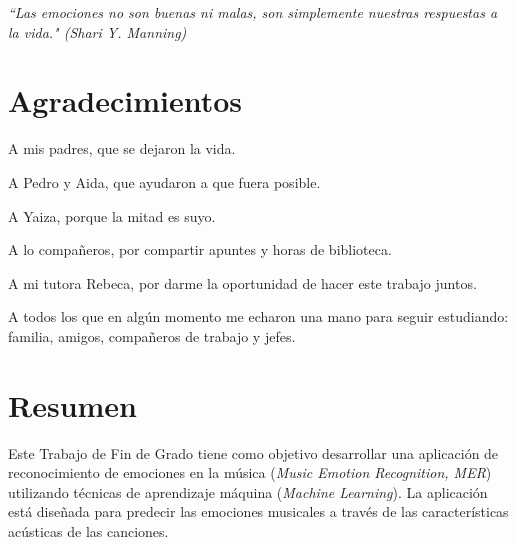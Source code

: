 \documentclass[12pt,a4paper]{article}
\begin{document}
\newpage
\thispagestyle{empty} %
\begin{flushright}
	\vspace*{5cm}
 	\textit{“Las emociones no son buenas ni malas, son simplemente nuestras respuestas a la vida." (Shari Y. Manning)}
\end{flushright}





\newpage
\thispagestyle{plain}
\section*{Agradecimientos}
 
\begin{flushleft}
A mis padres, que se dejaron la vida.


A Pedro y Aida, que ayudaron a que fuera posible.


A Yaiza, porque la mitad es suyo.


A lo compañeros, por compartir apuntes y horas de biblioteca.


A mi tutora Rebeca, por darme la oportunidad de hacer este trabajo juntos.


A todos los que en algún momento me echaron una mano para seguir estudiando: familia, amigos, compañeros de trabajo y jefes.


\end{flushleft}








\newpage
\section*{Resumen}
Este Trabajo de Fin de Grado tiene como objetivo desarrollar una aplicación de reconocimiento de emociones en la música (\textit{Music Emotion Recognition, MER}) utilizando técnicas de aprendizaje máquina (\textit{Machine Learning}). La aplicación está diseñada para predecir las emociones musicales a través de las características acústicas de las canciones.
\end{document}
